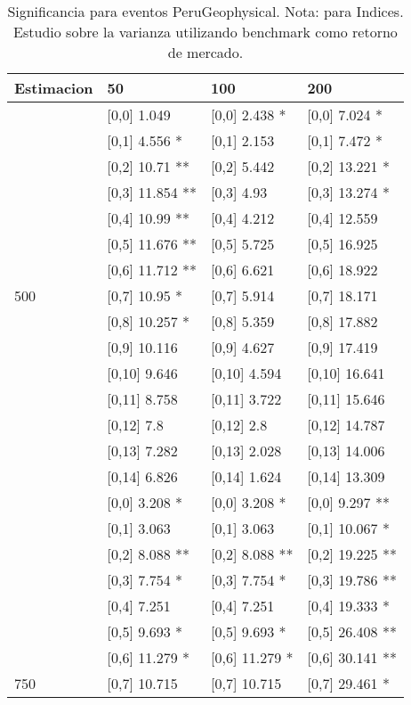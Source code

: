 \begin{table}

\caption{Significancia para eventos PeruGeophysical. Nota: para Indices. Estudio sobre la varianza utilizando benchmark como retorno de mercado.}
\centering
\begin{tabular}[t]{llll}
\toprule
Estimacion & 50 & 100 & 200\\
\midrule
 & {}[0,0] 1.049 & {}[0,0] 2.438 * & {}[0,0] 7.024 *\\
 & {}[0,1] 4.556 * & {}[0,1] 2.153 & {}[0,1] 7.472 *\\
 & {}[0,2] 10.71 ** & {}[0,2] 5.442 & {}[0,2] 13.221 *\\
 & {}[0,3] 11.854 ** & {}[0,3] 4.93 & {}[0,3] 13.274 *\\
 & {}[0,4] 10.99 ** & {}[0,4] 4.212 & {}[0,4] 12.559\\
\addlinespace
 & {}[0,5] 11.676 ** & {}[0,5] 5.725 & {}[0,5] 16.925\\
 & {}[0,6] 11.712 ** & {}[0,6] 6.621 & {}[0,6] 18.922\\
500 & {}[0,7] 10.95 * & {}[0,7] 5.914 & {}[0,7] 18.171\\
 & {}[0,8] 10.257 * & {}[0,8] 5.359 & {}[0,8] 17.882\\
 & {}[0,9] 10.116 & {}[0,9] 4.627 & {}[0,9] 17.419\\
\addlinespace
 & {}[0,10] 9.646 & {}[0,10] 4.594 & {}[0,10] 16.641\\
 & {}[0,11] 8.758 & {}[0,11] 3.722 & {}[0,11] 15.646\\
 & {}[0,12] 7.8 & {}[0,12] 2.8 & {}[0,12] 14.787\\
 & {}[0,13] 7.282 & {}[0,13] 2.028 & {}[0,13] 14.006\\
 & {}[0,14] 6.826 & {}[0,14] 1.624 & {}[0,14] 13.309\\
\addlinespace
 & {}[0,0] 3.208 * & {}[0,0] 3.208 * & {}[0,0] 9.297 **\\
 & {}[0,1] 3.063 & {}[0,1] 3.063 & {}[0,1] 10.067 *\\
 & {}[0,2] 8.088 ** & {}[0,2] 8.088 ** & {}[0,2] 19.225 **\\
 & {}[0,3] 7.754 * & {}[0,3] 7.754 * & {}[0,3] 19.786 **\\
 & {}[0,4] 7.251 & {}[0,4] 7.251 & {}[0,4] 19.333 *\\
\addlinespace
 & {}[0,5] 9.693 * & {}[0,5] 9.693 * & {}[0,5] 26.408 **\\
 & {}[0,6] 11.279 * & {}[0,6] 11.279 * & {}[0,6] 30.141 **\\
750 & {}[0,7] 10.715 & {}[0,7] 10.715 & {}[0,7] 29.461 *\\

\end{tabular}
\end{table}

